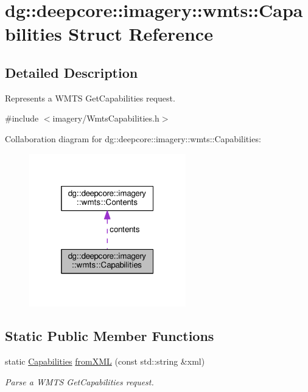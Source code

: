\hypertarget{structdg_1_1deepcore_1_1imagery_1_1wmts_1_1_capabilities}{}\section{dg\+:\+:deepcore\+:\+:imagery\+:\+:wmts\+:\+:Capabilities Struct Reference}
\label{structdg_1_1deepcore_1_1imagery_1_1wmts_1_1_capabilities}


\subsection{Detailed Description}
Represents a W\+M\+TS Get\+Capabilities request. 

{\ttfamily \#include $<$imagery/\+Wmts\+Capabilities.\+h$>$}



Collaboration diagram for dg\+:\+:deepcore\+:\+:imagery\+:\+:wmts\+:\+:Capabilities\+:
\nopagebreak
\begin{figure}[H]
\begin{center}
\leavevmode
\includegraphics[width=193pt]{structdg_1_1deepcore_1_1imagery_1_1wmts_1_1_capabilities__coll__graph}
\end{center}
\end{figure}
\subsection*{Static Public Member Functions}
\begin{DoxyCompactItemize}
\item 
static \hyperlink{structdg_1_1deepcore_1_1imagery_1_1wmts_1_1_capabilities}{Capabilities} \hyperlink{group___imagery_module_ga988934c965e1ad4eac2bdc22f8563349}{from\+X\+ML} (const std\+::string \&xml)
\begin{DoxyCompactList}\small\item\em Parse a W\+M\+TS Get\+Capabilities request. \end{DoxyCompactList}\end{DoxyCompactItemize}
